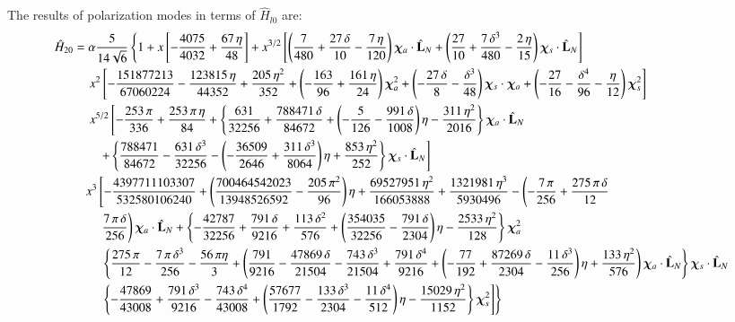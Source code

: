 \documentclass[prd,preprintnumbers,twocolumn,eqsecnum,floatfix,letter]{revtex4}
\begin{document}
\begin{widetext}
The results of polarization modes in terms of $\hat{H}_{l0}$ are:
\begin{subequations}
\begin{align}\label{eq:H20}
\hat{H}_{20} &= \alpha \frac{5}{14\sqrt{6}}\left\{ 1 + x\left[-\frac{4075}{4032} + \frac{67 \, \eta}{48}\right]+ x^{3/2}\left[\left(\frac{7}{480} +\frac{27 \, \delta}{10} - \frac{7 \,\eta}{120}\right)\bm{\chi}_a \cdot \hat{\mathbf{L}}_N+\left(\frac{27}{10} +\frac{7 \, \delta^3}{480} - \frac{2 \, \eta}{15}\right)\bm{\chi}_s \cdot \hat{\mathbf{L}}_N\right]\right. \nonumber \\
& \quad \left. x^2\left[-\frac{151877213}{67060224} -\frac{123815 \, \eta}{44352} +\frac{205 \, \eta^2}{352} +\left(-\frac{163}{96} +\frac{161 \, \eta}{24}\right)\bm{\chi}_a^2 + \left(-\frac{27 \, \delta}{8} -\frac{\delta^3}{48}\right)\bm{\chi}_s \cdot \bm{\chi}_a + \left(-\frac{27}{16}-\frac{\delta^4}{96} -\frac{\eta}{12}\right)\bm{\chi}_s^2\right]\right. \nonumber \\
& \quad \left. x^{5/2}\left[-\frac{253 \, \pi}{336}+ \frac{253 \, \pi \, \eta}{84} +\left\{\frac{631}{32256} + \frac{788471\,\delta}{84672} +\left(-\frac{5}{126}-\frac{991\,\delta}{1008}\right)\eta-\frac{311\,\eta^2}{2016}\right\}\bm{\chi}_a \cdot \hat{\mathbf{L}}_N\right.\right. \nonumber\\
& \qquad\left. +\left\{\frac{788471}{84672}-\frac{631\, \delta^3}{32256} -\left(-\frac{36509}{2646} + \frac{311\,\delta^3}{8064}\right)\eta+\frac{853\,\eta^2}{252}\right\}\bm{\chi}_s \cdot \hat{\mathbf{L}}_N\right] \nonumber \\
& \quad  x^3\left[-\frac{4397711103307}{532580106240} + \left( \frac{700464542023}{13948526592} - \frac{205 \, \pi^2}{96}\right)\eta + \frac{69527951 \, \eta^2}{166053888} + \frac{1321981 \, \eta^3}{5930496} -  \left(-\frac{7\,\pi}{256} + \frac{275\,\pi\,\delta}{12} \right.\right. \nonumber \\
& \qquad \left. \frac{7 \, \pi\,\delta}{256}\right)\bm{\chi}_a \cdot \hat{\mathbf{L}}_N + \left\{-\frac{42787}{32256} + \frac{791\,\delta}{9216} +\frac{113\,\delta^2}{576} + \left(\frac{354035}{32256} -\frac{791\,\delta}{2304}\right)\eta - \frac{2533\,\eta^2}{128}\right\}\bm{\chi}_a^2\nonumber\\
&\qquad \left.\left. \left\{\frac{275\,\pi}{12} -\frac{7\,\pi\,\delta^3}{256}-\frac{56\,\pi\eta}{3} + \left(\frac{791}{9216} -\frac{47869\,\delta}{21504}-\frac{743\,\delta^3}{21504} + \frac{791\,\delta^4}{9216} + \left(-\frac{77}{192}+\frac{87269\, \delta}{2304}-\frac{11\, \delta^3}{256}\right)\eta + \frac{133\,\eta^2}{576}\right)\bm{\chi}_a \cdot \hat{\mathbf{L}}_N\right\}\bm{\chi}_s \cdot \hat{\mathbf{L}}_N\right.\right.\nonumber\\
& \qquad \left.\left.\left\{-\frac{47869}{43008} + \frac{791\,\delta^3}{9216} -\frac{743\,\delta^4}{43008} + \left(\frac{57677}{1792} -\frac{133\,\delta^3}{2304} -\frac{11\,\delta^4}{512}\right)\eta - \frac{15029\,\eta^2}{1152}\right\}\bm{\chi}_s^2
\right]\right\}
\end{align}



\end{subequations}
\end{widetext}
\end{document}
